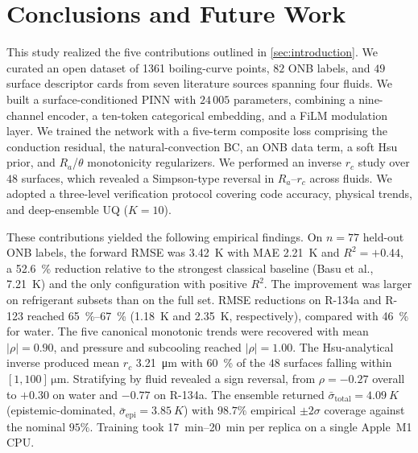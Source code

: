 
\section{Conclusions and Future Work}\label{sec:conclusions}

This study realized the five contributions outlined in
\cref{sec:introduction}. We curated an open dataset of \num{1361}
boiling-curve points, $82$ ONB labels, and $49$ surface descriptor cards
from seven literature sources spanning four fluids. We built a
surface-conditioned PINN with $24\,005$ parameters, combining a
nine-channel encoder, a ten-token categorical embedding, and a FiLM
modulation layer. We trained the network with a five-term composite loss
comprising the conduction residual, the natural-convection BC, an ONB
data term, a soft Hsu prior, and $R_a$/$\theta$ monotonicity
regularizers. We performed an inverse $r_c$ study over $48$ surfaces,
which revealed a Simpson-type reversal in $R_a$--$r_c$ across fluids.
We adopted a three-level verification protocol covering code accuracy,
physical trends, and deep-ensemble UQ ($K=10$).

These contributions yielded the following empirical findings. On $n=77$
held-out ONB labels, the forward RMSE was \SI{3.42}{K} with MAE
\SI{2.21}{K} and $R^2=+0.44$, a \SI{52.6}{\percent} reduction relative to
the strongest classical baseline (Basu et al., \SI{7.21}{K}) and the
only configuration with positive $R^2$. The improvement was larger on
refrigerant subsets than on the full set. RMSE reductions on R-134a and
R-123 reached \SIrange{65}{67}{\percent} (\SI{1.18}{K} and \SI{2.35}{K},
respectively), compared with \SI{46}{\percent} for water. The five
canonical monotonic trends were recovered with mean $|\rho|=0.90$, and
pressure and subcooling reached $|\rho|=1.00$. The Hsu-analytical
inverse produced mean $r_c$ \SI{3.21}{\micro\meter} with
\SI{60}{\percent} of the $48$ surfaces falling within
$[1,100]\,\si{\micro\meter}$. Stratifying by fluid revealed a sign
reversal, from $\rho=-0.27$ overall to $+0.30$ on water and $-0.77$ on
R-134a. The ensemble returned $\bar{\sigma}_{\mathrm{total}}=\SI{4.09}{K}$
(epistemic-dominated, $\bar{\sigma}_{\mathrm{epi}}=\SI{3.85}{K}$) with
$98.7\%$ empirical $\pm 2\sigma$ coverage against the nominal $95\%$.
Training took \SIrange{17}{20}{min} per replica on a single Apple~M1 CPU.

